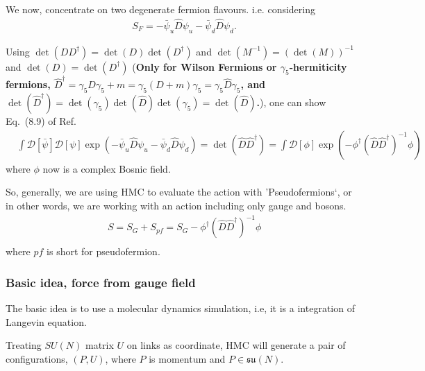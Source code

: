 We now, concentrate on two degenerate fermion flavours. i.e. considering
\begin{equation}
\begin{split}
&S_F=-\bar{\psi}_u \hat{D} \psi _u-\bar{\psi}_d \hat{D} \psi _d.
\end{split}
\end{equation}

Using $\det (DD^{\dagger})=\det (D)\det (D^{\dagger})$ and $\det(M^{-1})=\left(\det (M)\right)^{-1}$ and \textcolor[rgb]{1,0,0}{$\det (D)=\det (D^{\dagger})$} (\textbf{Only for Wilson Fermions or $\gamma _5$-hermiticity fermions, $\hat{D}^{\dagger}=\gamma _5 D \gamma _5 + m=\gamma _5 (D+m) \gamma _5=\gamma _5 \hat{D} \gamma _5$, and $\det(\hat{D}^{\dagger})=\det(\gamma _5)\det(\hat{D})\det(\gamma _5)=\det (\hat{D})$.}), one can show Eq.~(8.9) of Ref.~\cite{latticeqcdbook2010}
\begin{equation}
\begin{split}
&\int \mathcal{D}[\bar{\psi}]\mathcal{D}[\psi]\exp\left(-\bar{\psi}_u \hat{D} \psi _u-\bar{\psi}_d \hat{D} \psi _d\right)=\det (\hat{D}\hat{D}^{\dagger})=\int \mathcal{D}[\phi] \exp (-\phi ^{\dagger}\left(\hat{D}\hat{D}^{\dagger}\right)^{-1} \phi)
\end{split}
\end{equation}
where $\phi$ now is a complex Bosnic field.

So, generally, we are using HMC to evaluate the action with 'Pseudofermions`, or in other words, we are working with an action including only gauge and bosons.
\begin{equation}
\begin{split}
&S=S_G+S_{pf}=S_G-\phi ^{\dagger}\left(\hat{D}\hat{D}^{\dagger}\right)^{-1} \phi\\
\end{split}
\end{equation}
where $pf$ is short for pseudofermion.

\subsubsection{\label{hmc_scheme}Basic idea, force from gauge field}

The basic idea is to use a molecular dynamics simulation, i.e, it is a integration of Langevin equation.

Treating $SU(N)$ matrix $U$ on links as coordinate, HMC will generate a pair of configurations, $(P,U)$, where $P$ is momentum and $P\in \mathfrak{su}(N)$.

